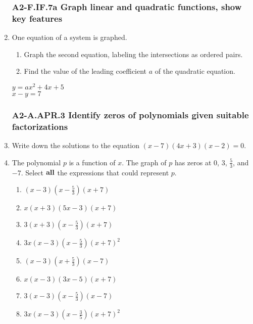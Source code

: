 \documentclass[12pt, twoside]{article}
\begin{document}
\begin{enumerate}[itemsep=0.5cm]
\newpage
\subsubsection*{A2-F.IF.7a Graph linear and quadratic functions, show key features}
\item One equation of a system is graphed. 
\begin{enumerate}
    \item Graph the second equation, labeling the intersections as ordered pairs.
    \item Find the value of the leading coefficient $a$ of the quadratic equation.
\end{enumerate}
\begin{multicols}{2}
    \hspace{1cm} $y = ax^2 + 4x + 5$ \\
    \columnbreak
    $x - y = 7$
    \end{multicols}
     \vspace{3cm}

  \begin{center}
  \end{center}
  

\newpage
\subsubsection*{A2-A.APR.3 Identify zeros of polynomials given suitable factorizations}
\item Write down the solutions to the equation $(x - 7)(4x + 3)(x - 2) = 0$. \vspace{2cm} 

\item The polynomial $p$ is a function of $x$. The graph of $p$ has zeros at $0$, $3$, $\frac{5}{3}$, and $-7$. Select $\bf{all}$ the expressions that could represent $p$. \vspace{0.25cm}
    \begin{multicols}{2}
    \begin{enumerate}
        \item $(x-3)(x-\frac{5}{3})(x+7)$
        \item $x(x+3)(5x-3)(x+7)$
        \item $3(x+3)(x-\frac{5}{3})(x+7)$
        \item $3x(x-3)(x-\frac{5}{3})(x+7)^2$
        \item $(x-3)(x+\frac{5}{3})(x-7)$
        \item $x(x-3)(3x-5)(x+7)$
        \item $3(x-3)(x-\frac{5}{3})(x-7)$
        \item $3x(x-3)(x-\frac{3}{5})(x+7)^2$
    \end{enumerate}
    \end{multicols}


\end{enumerate}
\end{document}
